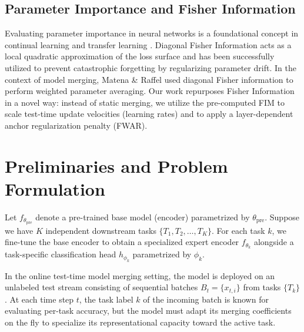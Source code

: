 \documentclass{article}
\begin{document}
\subsection{Parameter Importance and Fisher Information}
Evaluating parameter importance in neural networks is a foundational concept in continual learning and transfer learning \cite{kirkpatrick2017overcoming}. Diagonal Fisher Information acts as a local quadratic approximation of the loss surface and has been successfully utilized to prevent catastrophic forgetting by regularizing parameter drift. In the context of model merging, Matena \& Raffel \cite{matena2021merging} used diagonal Fisher information to perform weighted parameter averaging. Our work repurposes Fisher Information in a novel way: instead of static merging, we utilize the pre-computed FIM to scale test-time update velocities (learning rates) and to apply a layer-dependent anchor regularization penalty (FWAR).

\section{Preliminaries and Problem Formulation}
\label{sec:prelims}
Let $f_{\theta_{\text{pre}}}$ denote a pre-trained base model (encoder) parametrized by $\theta_{\text{pre}}$. Suppose we have $K$ independent downstream tasks $\{T_1, T_2, \dots, T_K\}$. For each task $k$, we fine-tune the base encoder to obtain a specialized expert encoder $f_{\theta_k}$ alongside a task-specific classification head $h_{\phi_k}$ parametrized by $\phi_k$. 

In the online test-time model merging setting, the model is deployed on an unlabeled test stream consisting of sequential batches $B_t = \{x_{t,i}\}$ from tasks $\{T_k\}$. At each time step $t$, the task label $k$ of the incoming batch is known for evaluating per-task accuracy, but the model must adapt its merging coefficients on the fly to specialize its representational capacity toward the active task.
\end{document}
